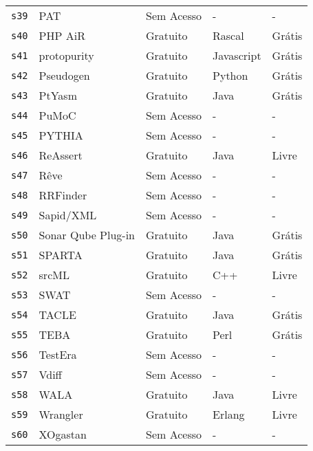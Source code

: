 \begin{longtable}{l l l l l}
    \texttt{s39} &
      PAT &
      Sem Acesso &
      - &
      - \\
    \texttt{s40} &
      PHP AiR &
      Gratuito &
      Rascal &
      Grátis \\
    \texttt{s41} &
      protopurity &
      Gratuito &
      Javascript &
      Grátis \\
    \texttt{s42} &
      Pseudogen &
      Gratuito &
      Python &
      Grátis \\
    \texttt{s43} &
      PtYasm &
      Gratuito &
      Java &
      Grátis \\
    \texttt{s44} &
      PuMoC &
      Sem Acesso &
      - &
      - \\
    \texttt{s45} &
      PYTHIA &
      Sem Acesso &
      - &
      - \\
    \texttt{s46} &
      ReAssert &
      Gratuito &
      Java &
      Livre \\
    \texttt{s47} &
      Rêve &
      Sem Acesso &
      - &
      - \\
    \texttt{s48} &
      RRFinder &
      Sem Acesso &
      - &
      - \\
    \texttt{s49} &
      Sapid/XML &
      Sem Acesso &
      - &
      - \\
    \texttt{s50} &
      Sonar Qube Plug-in &
      Gratuito &
      Java &
      Grátis \\
    \texttt{s51} &
      SPARTA &
      Gratuito &
      Java &
      Grátis \\
    \texttt{s52} &
      srcML &
      Gratuito &
      C++ &
      Livre \\
    \texttt{s53} &
      SWAT &
      Sem Acesso &
      - &
      - \\
    \texttt{s54} &
      TACLE &
      Gratuito &
      Java &
      Grátis \\
    \texttt{s55} &
      TEBA &
      Gratuito &
      Perl &
      Grátis \\
    \texttt{s56} &
      TestEra &
      Sem Acesso &
      - &
      - \\
    \texttt{s57} &
      Vdiff &
      Sem Acesso &
      - &
      - \\
    \texttt{s58} &
      WALA &
      Gratuito &
      Java &
      Livre \\
    \texttt{s59} &
      Wrangler &
      Gratuito &
      Erlang &
      Livre \\
    \texttt{s60} &
      XOgastan &
      Sem Acesso &
      - &
      - \\
  \hline
\end{longtable}
